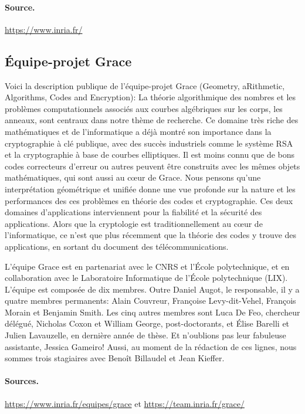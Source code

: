 \documentclass[a4paper, titlepage, 11pt]{article}
\theoremstyle{definition}
\theoremstyle{remark}
\begin{document}
\paragraph{Source.} \url{https://www.inria.fr/}

\subsection{Équipe-projet Grace}
Voici la description publique de l'équipe-projet Grace (Geometry, aRithmetic, Algorithms, Codes and Encryption): \og{}La théorie algorithmique des nombres et les problèmes computationnels associés aux courbes algébriques sur les corps, les anneaux, sont centraux dans notre thème de recherche. Ce domaine très riche des mathématiques et de l'informatique a déjà montré son importance dans la cryptographie à clé publique, avec des succès industriels comme le système RSA et la cryptographie à base de courbes elliptiques. Il est moins connu que de bons codes correcteurs d'erreur ou autres peuvent être construits avec les mêmes objets mathématiques, qui sont aussi au c\oe ur de Grace. Nous pensons qu'une interprétation géométrique et unifiée donne une vue profonde sur la nature et les performances des ces problèmes en théorie des codes et cryptographie. Ces deux domaines d'applications interviennent pour la fiabilité et la sécurité des applications. Alors que la cryptologie est traditionnellement au c\oe ur de l'informatique, ce n'est que plus récemment que la théorie des codes y trouve des applications, en sortant du document des télécommunications.\fg{}

L'équipe Grace est en partenariat avec le CNRS et l'École polytechnique, et en collaboration avec le Laboratoire Informatique de l'École polytechnique (LIX).
L'équipe est composée de dix membres. Outre Daniel Augot, le responsable, il y a quatre membres permanents: Alain Couvreur, Françoise Levy-dit-Vehel, François Morain et Benjamin Smith. Les cinq autres membres sont Luca De Feo, chercheur délégué, Nicholas Coxon et William George, post-doctorants, et Élise Barelli et Julien Lavauzelle, en dernière année de thèse.
Et n'oublions pas leur fabuleuse assistante, Jessica Gameiro!
Aussi, au moment de la rédaction de ces lignes, nous sommes trois stagiaires avec Benoît Billaudel et Jean Kieffer.

\paragraph{Sources.} \url{https://www.inria.fr/equipes/grace} et \url{https://team.inria.fr/grace/}
\end{document}
